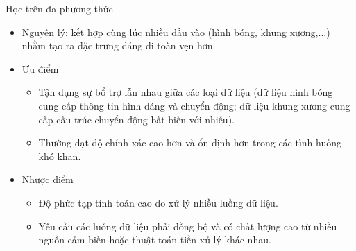 \begin{frame}{Học trên đa phương thức}
    \begin{itemize}
        \item Nguyên lý: kết hợp cùng lúc nhiều đầu vào (hình bóng, khung xương,...) nhằm tạo ra đặc trưng dáng đi toàn vẹn hơn.
        \item Ưu điểm
              \begin{itemize}
                  \item Tận dụng sự bổ trợ lẫn nhau giữa các loại dữ liệu (dữ liệu hình bóng cung cấp thông tin hình dáng và chuyển động; dữ liệu khung xương cung cấp cấu trúc chuyển động bất biến với nhiễu).
                  \item Thường đạt độ chính xác cao hơn và ổn định hơn trong các tình huống khó khăn.
              \end{itemize}
        \item Nhược điểm
              \begin{itemize}
                  \item Độ phức tạp tính toán cao do xử lý nhiều luồng dữ liệu.
                  \item Yêu cầu các luồng dữ liệu phải đồng bộ và có chất lượng cao từ nhiều nguồn cảm biến hoặc thuật toán tiền xử lý khác nhau.
              \end{itemize}
    \end{itemize}
\end{frame}

